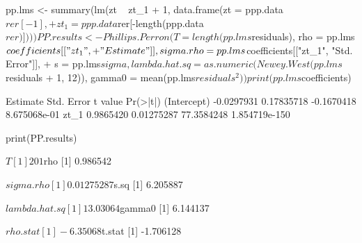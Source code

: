 \documentclass[a4paper]{article}
\renewcommand{\~}{\perispomeni}%
\begin{document}
\begin{Schunk}
\begin{Sinput}
 pp.lms <- summary(lm(zt ~ zt_1 + 1, data.frame(zt = ppp.data$rer[-1], 
+     zt_1 = ppp.data$rer[-length(ppp.data$rer)])))
 PP.results <- Phillips.Perron(T = length(pp.lms$residuals), rho = pp.lms$coefficients[["zt_1", 
+     "Estimate"]], sigma.rho = pp.lms$coefficients[["zt_1", "Std. Error"]], 
+     s = pp.lms$sigma, lambda.hat.sq = as.numeric(Newey.West(pp.lms$residuals %
+         1, 12)), gamma0 = mean(pp.lms$residuals^2))
 print(pp.lms$coefficients)
\end{Sinput}
\begin{Soutput}
              Estimate Std. Error    t value      Pr(>|t|)
(Intercept) -0.0297931 0.17835718 -0.1670418  8.675068e-01
zt_1         0.9865420 0.01275287 77.3584248 1.854719e-150
\end{Soutput}
\begin{Sinput}
 print(PP.results)
\end{Sinput}
\begin{Soutput}
$T
[1] 201

$rho
[1] 0.986542

$sigma.rho
[1] 0.01275287

$s.sq
[1] 6.205887

$lambda.hat.sq
[1] 13.03064

$gamma0
[1] 6.144137

$rho.stat
[1] -6.35068

$t.stat
[1] -1.706128
\end{Soutput}
\end{Schunk}
\end{document}
